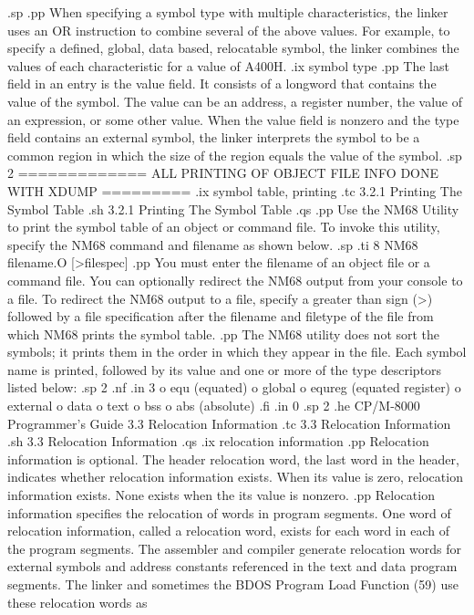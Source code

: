 .sp
.pp
When specifying a symbol type with multiple characteristics, the
linker uses an OR instruction to combine several of the above
values.  For example, to specify a defined, global, data based,
relocatable symbol, the linker combines the values of each
characteristic for a value of A400H. 
.ix symbol type
.pp
The last field in an entry is the value field.  It consists of a
longword that contains the value of the symbol.  The value can be
an address, a register number, the value of an expression, or
some other value.  When the value field is nonzero and the type 
field contains an external symbol, the linker
interprets the symbol to be a common region in which the size of
the region equals the value of the symbol. 
.sp 2
============= ALL PRINTING OF OBJECT FILE INFO DONE WITH XDUMP =========
.ix symbol table, printing
.tc         3.2.1  Printing The Symbol Table
.sh
3.2.1  Printing The Symbol Table
.qs
.pp
Use the NM68 Utility to print the symbol table of an object or 
command file.  To invoke this utility, specify
the NM68 command and filename as shown below.
.sp
.ti 8
NM68 filename.O [>filespec]
.pp
You must enter the filename of an object file or a command 
file.  You can optionally redirect the NM68 output from your console to a 
file.  To redirect the NM68 output to a file, specify a
greater than sign (>) followed by a file specification after
the filename and filetype of the file from which NM68 prints the
symbol table.
.pp
The NM68 utility does not sort the symbols; it prints them in the order in 
which they appear in the file.  Each symbol name is printed, followed by its 
value and one or more of the type descriptors listed below:
.sp 2
.nf
.in 3
o equ (equated)
o global
o equreg (equated register)
o external
o data
o text
o bss
o abs (absolute)
.fi
.in 0
.sp 2
.he CP/M-8000 Programmer's Guide           3.3  Relocation Information
.tc    3.3  Relocation Information
.sh
3.3  Relocation Information
.qs
.ix relocation information
.pp
Relocation information is optional.  The header relocation word,
the last word in the header, indicates whether relocation
information exists.  When its value is zero, relocation
information exists.  None exists when the its value is nonzero. 
.pp
Relocation information specifies the relocation of words in program
segments.  One word of relocation information, called a relocation word,
exists for each word in each of the program segments.  The assembler and
compiler generate relocation words for external symbols and address
constants referenced in the text and data program segments.  The linker and
sometimes the BDOS Program Load Function (59) use these relocation words as
